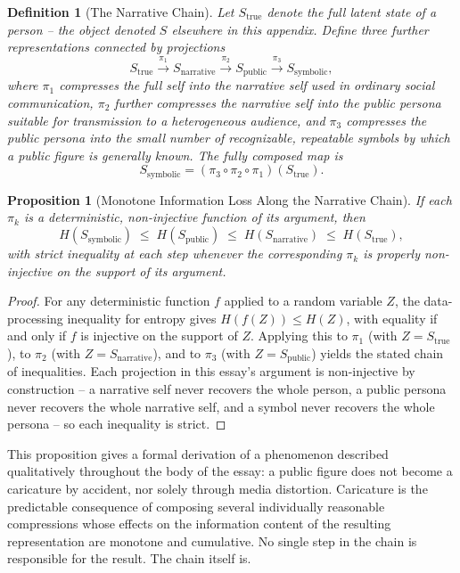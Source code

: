 \documentclass[11pt]{article}
\theoremstyle{plain}
\newtheorem{definition}{Definition}[section]
\newtheorem{proposition}{Proposition}[section]
\begin{document}
\begin{definition}[The Narrative Chain]
Let $S_{\mathrm{true}}$ denote the full latent state of a person -- the object denoted $S$ elsewhere in this appendix. Define three further representations connected by projections
\[
S_{\mathrm{true}} \xrightarrow{\ \pi_1\ } S_{\mathrm{narrative}} \xrightarrow{\ \pi_2\ } S_{\mathrm{public}} \xrightarrow{\ \pi_3\ } S_{\mathrm{symbolic}},
\]
where $\pi_1$ compresses the full self into the narrative self used in ordinary social communication, $\pi_2$ further compresses the narrative self into the public persona suitable for transmission to a heterogeneous audience, and $\pi_3$ compresses the public persona into the small number of recognizable, repeatable symbols by which a public figure is generally known. The fully composed map is
\[
S_{\mathrm{symbolic}} = (\pi_3 \circ \pi_2 \circ \pi_1)(S_{\mathrm{true}}).
\]
\end{definition}

\begin{proposition}[Monotone Information Loss Along the Narrative Chain]
If each $\pi_k$ is a deterministic, non-injective function of its argument, then
\[
H(S_{\mathrm{symbolic}}) \;\leq\; H(S_{\mathrm{public}}) \;\leq\; H(S_{\mathrm{narrative}}) \;\leq\; H(S_{\mathrm{true}}),
\]
with strict inequality at each step whenever the corresponding $\pi_k$ is properly non-injective on the support of its argument.
\end{proposition}
\begin{proof}
For any deterministic function $f$ applied to a random variable $Z$, the data-processing inequality for entropy gives $H(f(Z)) \leq H(Z)$, with equality if and only if $f$ is injective on the support of $Z$. Applying this to $\pi_1$ (with $Z = S_{\mathrm{true}}$), to $\pi_2$ (with $Z = S_{\mathrm{narrative}}$), and to $\pi_3$ (with $Z = S_{\mathrm{public}}$) yields the stated chain of inequalities. Each projection in this essay's argument is non-injective by construction -- a narrative self never recovers the whole person, a public persona never recovers the whole narrative self, and a symbol never recovers the whole persona -- so each inequality is strict.
\end{proof}

This proposition gives a formal derivation of a phenomenon described qualitatively throughout the body of the essay: a public figure does not become a caricature by accident, nor solely through media distortion. Caricature is the predictable consequence of composing several individually reasonable compressions whose effects on the information content of the resulting representation are monotone and cumulative. No single step in the chain is responsible for the result. The chain itself is.
\end{document}
